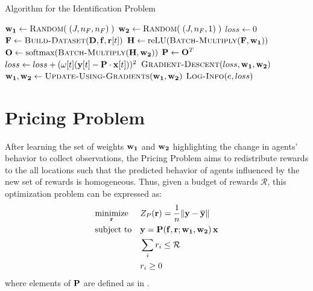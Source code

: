 \begin{algorithm}[!htbp]
    \caption{Algorithm for the Identification Problem} \label{alg:Algorithm for the Identification Problem}
    \begin{algorithmic}[1]
        \State $\matr{w_1} \gets \Call{Random}{\;(J,n_F,n_F)\;}$
        \State $\matr{w_2} \gets \Call{Random}{\;(J,n_F,1)\;}$
            \State $loss \gets 0$
                \State $\matr{F} \gets \Call{Build-Dataset}{\matr{D}, \matr{f}, \matr{r}[t]}$
                \State $\matr{H} \gets  \text{reLU}(\Call{Batch-Multiply}{\matr{F}, \matr{w_1}})$
                \State $\matr{O} \gets \text{softmax}(\Call{Batch-Multiply}{\matr{H}, \matr{w_2}})$
                \State $\mathbf{P} \gets \mathbf{O}^T$
                \State $loss \gets loss + (\omega[t](\mathbf{y}[t] - \mathbf{P} \cdot \mathbf{x}[t]))^2$
            \EndFor
            \State $\Call{Gradient-Descent}{loss, \matr{w_1}, \matr{w_2}}$
            \State $\matr{w_1}, \matr{w_2} \gets \Call{Update-Using-Gradients}{\matr{w_1}, \matr{w_2}}$
            \State $\Call{Log-Info}{e, loss}$
        \EndFor
    \end{algorithmic}
\end{algorithm}

\section{Pricing Problem} \label{sec:Pricing Problem}
After learning the set of weights $\mathbf{w_1}$ and $\mathbf{w_2}$ highlighting the change in agents' behavior to collect observations, the Pricing Problem aims to redistribute rewards to the all locations such that the predicted behavior of agents influenced by the new set of rewards is homogeneous. Thus, given a budget of rewards $\mathcal{R}$, this optimization problem can be expressed as:
\begin{equation} \label{eqn:pricing_problem}
    \begin{aligned}
        & \underset{\mathbf{r}}{\text{minimize}}
        & & Z_P(\mathbf{r}) = \frac{1}{n}\lVert \mathbf{y} - \overline{\mathbf{y}} \rVert\\
        & \text{subject to}
        & & \mathbf{y} = \mathbf{P}(\mathbf{f}, \mathbf{r}; \mathbf{w_1}, \mathbf{w_2}) \, \mathbf{x}\\
        &&& \sum_{i} r_i \leq \mathcal{R}\\
        &&& r_i \geq 0
    \end{aligned}
\end{equation}
where elements of $\mathbf{P}$ are defined as in .

